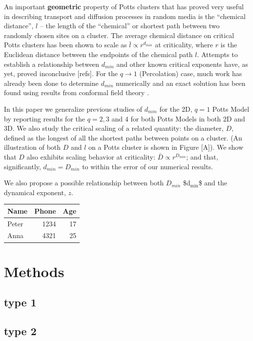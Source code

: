 \documentclass[aps, twocolumn, groupedaddress]{revtex4}
\begin{document}
An important \textbf{geometric} property of Potts clusters that has proved very useful in describing transport and diffusion processes in random media is the ``chemical distance'', $l$ -- the length of the ``chemical'' or shortest path between two randomly chosen sites on a cluster.  The average chemical distance on critical Potts clusters has been shown to scale as $\bar{l} \propto r^{d_{min}}$ at criticality, where $r$ is the Euclidean distance between the endpoints of the chemical path $l$. Attempts to establish a relationship between $d_{min}$ and other known critical exponents have, as yet, proved inconclusive [refs].  For the $q \to 1$ (Percolation) case, much work has already been done to determine $d_{min}$ numerically \cite{Gr83, HrSt88} and an exact solution has been found using results from conformal field theory \cite{Zi99}.
 
In this paper we generalize previous studies of $d_{min}$ for the 2D, $q=1$ Potts Model by reporting results for the $q = 2, 3$ and $4$ for both Potts Models in both 2D and 3D.  We also study the critical scaling of a related quantity: the diameter, $D$, defined as the longest of all the shortest paths between points on a cluster. (An illustration of both $D$ and $l$ on a Potts cluster is shown in Figure [A]).  We show that $D$ also exhibits scaling behavior at criticality: $\bar{D} \propto r^{D_{min}}$; and that, significantly, $d_{min} = D_{min}$ to within the error of our numerical results.  
 
We also propose a possible relationship between both $D_{min}$ \$d$_{\mathrm{min}}$\$ and the dynamical exponent, $z$.


\begin{center}
\begin{tabular}{lrr}
 Name   &  Phone  &  Age  \\
\hline
 Peter  &   1234  &   17  \\
 Anna   &   4321  &   25  \\
\end{tabular}
\end{center}
\section{Methods}
\label{sec-2}
\subsection{type 1}
\label{sec-2.1}
\subsection{type 2}
\label{sec-2.2}
\end{document}
